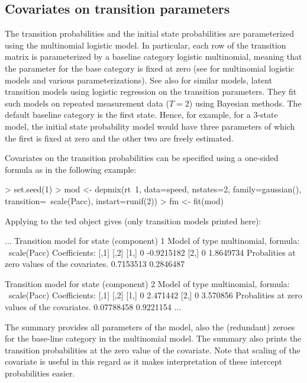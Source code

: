 \documentclass[article]{jss}
\begin{document}
\subsection{Covariates on transition parameters}

The transition probabilities and the initial state probabilities
are parameterized using the multinomial
logistic model.   In particular, each row of the transition matrix is
parameterized by a baseline category logistic multinomial, 
meaning that the parameter for the
base category is fixed at zero (see \citet[see][p.\ 267
ff.]{Agresti2002} for multinomial logistic models and various
parameterizations). See also \citet{Chung2007} for similar models, latent transition models using logistic regression on the transition parameters. They fit such models on repeated measurement
data ($T=2$) using Bayesian methods.  The default baseline category is the first state.
Hence, for example, for a 3-state model, the initial state probability
model would have three parameters of which the first is fixed at zero
and the other two are freely estimated.

Covariates on the transition probabilities can be specified using a
one-sided formula as in the following example:
\begin{CodeChunk}
\begin{CodeInput}
> set.seed(1)
> mod <- depmix(rt~1, data=speed, nstates=2, family=gaussian(), 
  transition=~scale(Pacc), instart=runif(2))
> fm <- fit(mod)
\end{CodeInput}
\end{CodeChunk}

Applying  to the ted object gives (only transition models
printed here): 
\begin{CodeChunk}
\begin{CodeOutput}
...
Transition model for state (component) 1 
Model of type multinomial, formula: ~scale(Pacc)
Coefficients: 
	 [,1]       [,2]
[1,]    0 -0.9215182
[2,]    0  1.8649734
Probalities at zero values of the covariates.
0.7153513 0.2846487 

Transition model for state (component) 2 
Model of type multinomial, formula: ~scale(Pacc)
Coefficients: 
	 [,1]     [,2]
[1,]    0 2.471442
[2,]    0 3.570856
Probalities at zero values of the covariates.
0.07788458 0.9221154
...
\end{CodeOutput}
\end{CodeChunk}
The summary provides all parameters of the model, also the 
(redundant) zeroes for the base-line category in the multinomial model. 
The summary also prints the transition probabilities
at the zero value of the covariate. Note that scaling of the covariate 
is useful in this regard as it makes interpretation of these intercept probabilities 
easier. 
\end{document}
